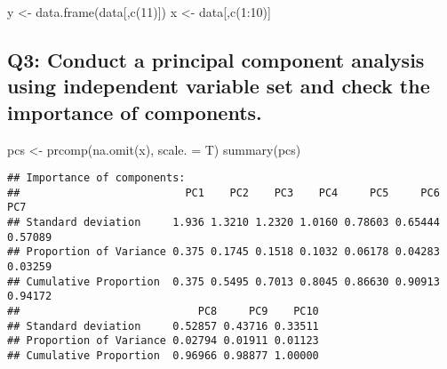 \documentclass[
]{article}
\newenvironment{Shaded}{\begin{snugshade}}{\end{snugshade}}
\newcommand{\AttributeTok}[1]{\textcolor[rgb]{0.77,0.63,0.00}{#1}}
\newcommand{\DecValTok}[1]{\textcolor[rgb]{0.00,0.00,0.81}{#1}}
\newcommand{\FunctionTok}[1]{\textcolor[rgb]{0.00,0.00,0.00}{#1}}
\newcommand{\NormalTok}[1]{#1}
\newcommand{\OtherTok}[1]{\textcolor[rgb]{0.56,0.35,0.01}{#1}}
\newcommand{\SpecialCharTok}[1]{\textcolor[rgb]{0.00,0.00,0.00}{#1}}
\begin{document}
\begin{Shaded}
\begin{Highlighting}[]
\NormalTok{y }\OtherTok{\textless{}{-}} \FunctionTok{data.frame}\NormalTok{(data[,}\FunctionTok{c}\NormalTok{(}\DecValTok{11}\NormalTok{)])}
\NormalTok{x }\OtherTok{\textless{}{-}}\NormalTok{ data[,}\FunctionTok{c}\NormalTok{(}\DecValTok{1}\SpecialCharTok{:}\DecValTok{10}\NormalTok{)]}
\end{Highlighting}
\end{Shaded}

\hypertarget{q3-conduct-a-principal-component-analysis-using-independent-variable-set-and-check-the-importance-of-components.}{%
\subsection{Q3: Conduct a principal component analysis using independent
variable set and check the importance of
components.}\label{q3-conduct-a-principal-component-analysis-using-independent-variable-set-and-check-the-importance-of-components.}}

\begin{Shaded}
\begin{Highlighting}[]
\NormalTok{pcs }\OtherTok{\textless{}{-}} \FunctionTok{prcomp}\NormalTok{(}\FunctionTok{na.omit}\NormalTok{(x), }\AttributeTok{scale. =}\NormalTok{ T)}
\FunctionTok{summary}\NormalTok{(pcs)}
\end{Highlighting}
\end{Shaded}

\begin{verbatim}
## Importance of components:
##                          PC1    PC2    PC3    PC4     PC5     PC6     PC7
## Standard deviation     1.936 1.3210 1.2320 1.0160 0.78603 0.65444 0.57089
## Proportion of Variance 0.375 0.1745 0.1518 0.1032 0.06178 0.04283 0.03259
## Cumulative Proportion  0.375 0.5495 0.7013 0.8045 0.86630 0.90913 0.94172
##                            PC8     PC9    PC10
## Standard deviation     0.52857 0.43716 0.33511
## Proportion of Variance 0.02794 0.01911 0.01123
## Cumulative Proportion  0.96966 0.98877 1.00000
\end{verbatim}

\begin{Shaded}
\end{Shaded}
\end{document}

